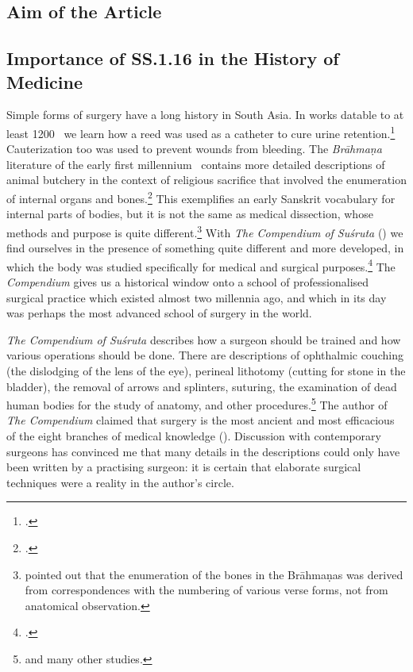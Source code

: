 
\subsection{Aim of the Article}

\subsection{Importance of SS.1.16 in the History of Medicine}


Simple forms of surgery have a long history in South Asia. In works datable to at
least 1200 \BC\ we learn how a reed was used as a catheter to cure urine
retention.\footcite[70--71]{zysk-1985} Cauterization too was used to prevent
wounds from bleeding. The \emph{Brāhmaṇa} literature of the early first 
millennium
\BC\ contains more detailed descriptions of animal butchery in the context of
religious sacrifice that involved the enumeration of internal organs and
bones.\footcite{mala-1996}   This exemplifies an early Sanskrit vocabulary for
internal parts of bodies, but it is not the same as medical dissection, whose
methods and purpose is quite different.\footnote{\citet{keit-1908} pointed out
that the enumeration of the bones in the Brāhmaṇas was derived from
correspondences with the numbering of various verse forms, not from anatomical
observation.}  With \emph{The Compendium of Suśruta} (\SS) we find ourselves 
in
the presence of something quite different and more developed, in which the body
was studied specifically for medical and surgical purposes.\footcite{zysk-1986} 
The \emph{Compendium} gives us a historical window onto a school of
professionalised surgical practice which existed almost two millennia ago, and
which in its day was perhaps the most advanced school of surgery in the world.



\emph{The Compendium of Suśruta} describes how a surgeon should be trained 
and how
various operations should be done.  There are descriptions of ophthalmic couching
(the dislodging of the lens of the eye), perineal lithotomy (cutting for stone in
the bladder), the removal of arrows and splinters, suturing, the examination of
dead human bodies for the study of anatomy, and other
procedures.\footnote{\cites{mukh-1913,desh-2000,nara-2011,wuja-2003,wils-1823}
 and
many other studies.} The author of \emph{The Compendium} claimed that 
surgery is
the most ancient and most efficacious of the eight branches of medical knowledge
(). Discussion with contemporary surgeons has convinced me 
that
many details in the descriptions could only have been written by a practising
surgeon: it is certain that elaborate surgical techniques were a reality in
the author's circle.

